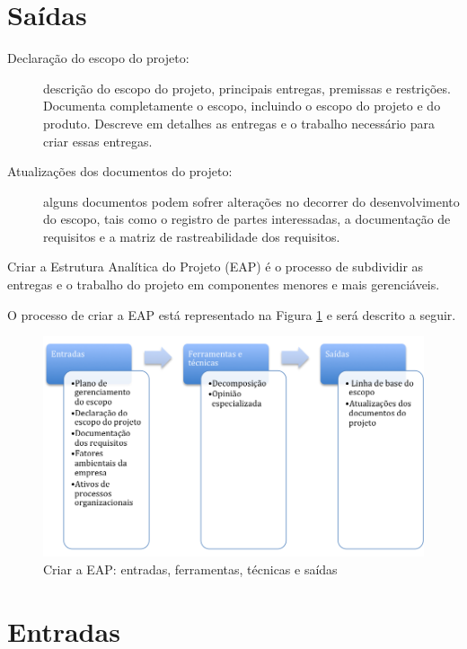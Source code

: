 \section{Saídas}

\begin{description}
	
	\item[Declaração do escopo do projeto:] descrição do escopo do projeto, principais entregas, premissas e restrições. Documenta completamente o escopo, incluindo o escopo do projeto e do produto. Descreve em detalhes as entregas e o trabalho necessário para criar essas entregas.
	
	\item[Atualizações dos documentos do projeto:] alguns documentos podem sofrer alterações no decorrer do desenvolvimento do escopo, tais como o registro de partes interessadas, a documentação de requisitos e a matriz de rastreabilidade dos requisitos.
	
\end{description}


Criar a Estrutura Analítica do Projeto (EAP) é o processo de subdividir as entregas e o trabalho do projeto em componentes menores e mais gerenciáveis.

O processo de criar a EAP está representado na Figura \ref{fig:escopo:eap:efts} e será descrito a seguir.

\begin{figure}[!h]
	\centering
	\includegraphics[scale=0.5]{Figuras/escopo_efts_EAP.png}
	\caption{Criar a EAP: entradas, ferramentas, técnicas e saídas}
	\label{fig:escopo:eap:efts}
\end{figure}

\section{Entradas}

